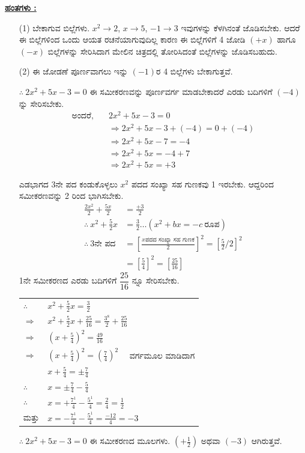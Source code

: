 \newpage 

\noindent
{\textbf{\underline{ಹಂತಗಳು :}}}
\begin{itemize}
\item [(1)] ಬೇಕಾಗುವ ಬಿಲ್ಲೆಗಳು. $x^2 \rightarrow 2$, $x \rightarrow 5$, $-1 \rightarrow 3$ ಇವುಗಳನ್ನು ಕೆಳಗಿನಂತೆ ಜೊಡಿಸಬೇಕು. ಆದರೆ ಈ ಬಿಲ್ಲೆಗಳಿಂದ ಒಂದು ಆಯತ ರಚನೆಯಾಗುವುದಿಲ್ಲ ಕಾರಣ ಈ ಬಿಲ್ಲೆಗಳಿಗೆ 4 ಜೋಡಿ $(+x)$ ಹಾಗೂ $(-x)$ ಬಿಲ್ಲೆಗಳನ್ನು ಸೇರಿಸಿದಾಗ ಮೇಲಿನ ಚಿತ್ರದಲ್ಲಿ ತೋರಿಸಿದಂತೆ ಬಿಲ್ಲೆಗಳನ್ನು ಜೊಡಿಸಬಹುದು.
\item [(2)] ಈ ಜೋಡಣೆ ಪೂರ್ಣವಾಗಲು ಇನ್ನು $(-1)$ರ 4 ಬಿಲ್ಲೆಗಳು ಬೇಕಾಗುತ್ತವೆ. 

$\therefore~ 2x^2 + 5x - 3 = 0$ ಈ ಸಮೀಕರಣವನ್ನು ಪೂರ್ಣವರ್ಗ ಮಾಡಬೇಕಾದರೆ ಎರಡು ಬದಿಗಳಿಗೆ $(-4)$ನ್ನು ಸೇರಿಸಬೇಕು.
\begin{align*}
\text{ಅಂದರೆ},\quad & 2x^2 + 5x - 3 = 0\\
& \Rightarrow 2x^2 + 5x - 3 + (-4) = 0 + (-4)\\
& \Rightarrow 2x^2 + 5x - 7 = -4\\
& \Rightarrow 2x^2 + 5x = -4 + 7\\
& \Rightarrow 2x^2 + 5x = +3
\end{align*}

ಎಡಭಾಗದ 3ನೇ ಪದ ಕಂಡುಕೊಳ್ಳಲು $x^2$ ಪದದ ಸಂಖ್ಯಾ ಸಹ ಗುಣಕವು 1 ಇರಬೇಕು. ಆದ್ದರಿಂದ ಸಮೀಕರಣವನ್ನು 2 ರಿಂದ ಭಾಗಿಸಬೇಕು.
\begin{align*}
\frac{2x^2}{2} + \frac{5x}{2} & = \frac{+3}{2}\\
\therefore~ x^2 + \frac{5}{2}x & = \frac{3}{2} \hdots (x^2 + bx = -c ~\text{ರೂಪ}) \tag{1}\\
\therefore~ 3\text{ನೇ ಪದ} & = \left[\frac{x \text{ಪದದ ಸಂಖ್ಯಾ ಸಹ ಗುಣಕ}}{2} \right]^2  = \left[\frac{5}{2}/2 \right]^2 \\
& = \left[\frac{5}{4}\right]^2 = \left[\frac{25}{16} \right]
\end{align*} 
1ನೇ ಸಮೀಕರಣದ ಎರಡು ಬದಿಗಳಿಗೆ $\dfrac{25}{16}$ ನ್ನೂ ಸೇರಿಸಬೇಕು.

\begin{tabular}{ll}
$\therefore$ & $x^2 + \frac{5}{2}x = \frac{3}{2}$\\
$\Rightarrow$ & $x^2 + \frac{5}{2}x + \frac{25}{16} = \frac{3^8}{2} + \frac{25}{16}$\\
$\Rightarrow$ & $\left(x + \frac{5}{4} \right)^2 = \frac{49}{16}$\\
$\Rightarrow$ & $\left(x + \frac{5}{4} \right)^2 = \left(\frac{7}{4} \right)^2 \quad$ ವರ್ಗಮೂಲ ಮಾಡಿದಾಗ \\
& $x + \frac{5}{4} = \pm \frac{7}{4}$\\
$\therefore$ & $x = \pm \frac{7}{4} - \frac{5}{4}$\\
$\therefore$ & $x = +\frac{7^1}{4} - \frac{5^1}{4} = \frac{2}{4} = \frac{1}{2}$\\
ಮತ್ತು\quad & $x = -\frac{7^1}{4} - \frac{5^1}{4} = \frac{-12}{4} = -3$ 
\end{tabular}

$\therefore~ 2x^2 + 5x - 3 = 0$ ಈ ಸಮೀಕರಣದ ಮೂಲಗಳು. $\left(+\frac{1}{2} \right)$ ಅಥವಾ $(-3)$ ಆಗಿರುತ್ತವೆ.
\end{itemize}

